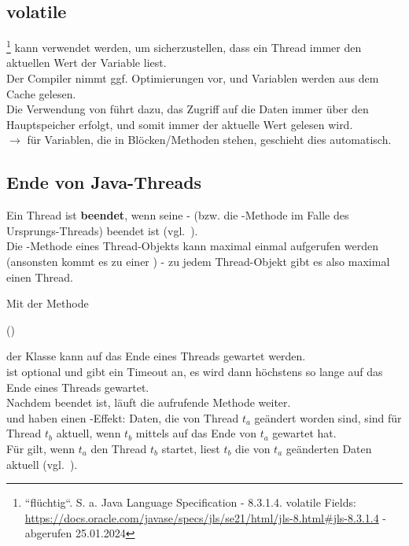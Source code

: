 \subsection*{volatile}
\footnote{``flüchtig``.
S. a. Java Language Specification - 8.3.1.4. volatile Fields: \url{https://docs.oracle.com/javase/specs/jls/se21/html/jls-8.html#jls-8.3.1.4} - abgerufen 25.01.2024
} kann verwendet werden, um sicherzustellen, dass ein Thread immer den aktuellen Wert der Variable liest.\\
Der Compiler nimmt ggf. Optimierungen vor, und Variablen werden aus dem Cache gelesen.\\
Die Verwendung von  führt dazu, das Zugriff auf die Daten immer über den Hauptspeicher erfolgt, und somit immer der aktuelle Wert gelesen wird.\\

$\rightarrow$ für Variablen, die in  Blöcken/Methoden stehen, geschieht dies automatisch.

\subsection{Ende von Java-Threads}

Ein Thread ist \textbf{beendet}, wenn seine - (bzw. die -Methode im Falle des Ursprungs-Threads) beendet ist (vgl.~\cite[33]{Oec22}).\\

\noindent
Die -Methode eines Thread-Objekts kann maximal einmal aufgerufen werden (ansonsten kommt es zu einer ) - zu jedem Thread-Objekt gibt es also maximal einen Thread.

\noindent
Mit der Methode

\begin{center}
     ()
\end{center}

der Klasse  kann auf das Ende eines Threads gewartet werden.\\
 ist optional und gibt ein Timeout an, es wird dann höchstens so lange auf das Ende eines Threads gewartet.\\
Nachdem  beendet ist, läuft die aufrufende Methode weiter.\\

\noindent
{} und  haben einen -Effekt: Daten, die von Thread $t_a$ geändert worden sind, sind für Thread $t_b$ aktuell, wenn $t_b$ mittels  auf das Ende von $t_a$ gewartet hat.\\
Für  gilt, wenn $t_a$ den Thread $t_b$ startet, liest $t_b$ die von $t_a$ geänderten Daten aktuell (vgl.~\cite[37]{Oec22}).\\

